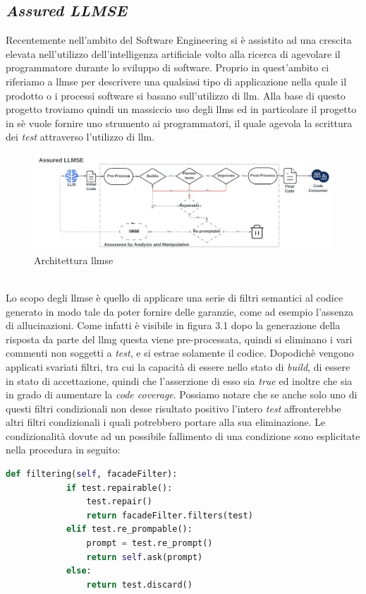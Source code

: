     \subsection{\textit{Assured LLMSE}}
    Recentemente nell'ambito del Software Engineering si è assistito ad una crescita elevata nell'utilizzo dell'intelligenza artificiale volto alla ricerca di agevolare il programmatore durante lo sviluppo di software.
    Proprio in quest'ambito ci riferiamo a \gls{llmse} per descrivere una qualsiasi tipo di applicazione nella quale il prodotto o i processi software si basano sull'utilizzo di \gls{llm}\cite{article:Alshahwan2024AssuredLS}.
    Alla base di questo progetto troviamo quindi un massiccio uso degli \glspl{llm} ed in particolare il progetto in sè vuole fornire uno strumento ai programmatori, il quale agevola la scrittura dei \textit{test} attraverso l'utilizzo di \gls{llm}.
    \begin{figure}[!h]
        \centering        
        \includegraphics[width=14.5cm]{img/LLMSE.png}
        \caption{Architettura \gls{llmse}\cite{article:Alshahwan2024AssuredLS}}
    \end{figure}
  \\Lo scopo degli \gls{llmse} è quello di applicare una serie di filtri semantici al codice generato in modo tale da poter fornire delle garanzie, come ad esempio l'assenza di allucinazioni.
    Come infatti è visibile in figura 3.1 dopo la generazione della risposta da parte del \gls{llmg} questa viene pre-processata, quindi si eliminano i vari commenti non soggetti a \textit{test}, e si estrae solamente il codice.
    Dopodichè vengono applicati svariati filtri, tra cui la capacità di essere nello stato di \textit{build}, di essere in stato di accettazione, quindi che l'asserzione di esso sia \textit{true} ed inoltre che sia in grado di aumentare la \textit{code coverage}.
    Possiamo notare che se anche solo uno di questi filtri condizionali non desse risultato positivo l'intero \textit{test} affronterebbe altri filtri condizionali i quali potrebbero portare alla sua eliminazione.
    Le condizionalità dovute ad un possibile fallimento di una condizione sono esplicitate nella procedura in seguito:
    \begin{lstlisting}[language=Python]
        def filtering(self, facadeFilter):
            if test.repairable():
                test.repair()
                return facadeFilter.filters(test)
            elif test.re_prompable():
                prompt = test.re_prompt()
                return self.ask(prompt)
            else:
                return test.discard()
    \end{lstlisting}
    
